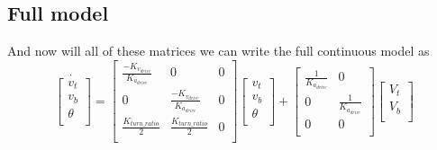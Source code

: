 \documentclass{scrartcl}
\begin{document}
\subsection{Full model}
And now will all of these matrices we can write the full continuous model as
\begin{equation}
    \dot{\begin{bmatrix}
            v_t    \\
            v_b    \\
            \theta \\
        \end{bmatrix}} =
    \begin{bmatrix}
        \frac{-K_{v_\mathit{drive}}}{K_{a_\mathit{drive}}} & 0                                                  & 0 \\
        0                                                  & \frac{-K_{v_\mathit{drive}}}{K_{a_\mathit{drive}}} & 0 \\
        \frac{K_\mathit{turn\_ratio}}{2}                   & \frac{K_\mathit{turn\_ratio}}{2}                   & 0 \\
    \end{bmatrix}\begin{bmatrix}
        v_t    \\
        v_b    \\
        \theta \\
    \end{bmatrix} + \begin{bmatrix}
        \frac{1}{K_{a_\mathit{drive}}} & 0                              \\
        0                              & \frac{1}{K_{a_\mathit{drive}}} \\
        0                              & 0                              \\
    \end{bmatrix}\begin{bmatrix}
        V_t \\
        V_b \\
    \end{bmatrix}
\end{equation}
\end{document}
